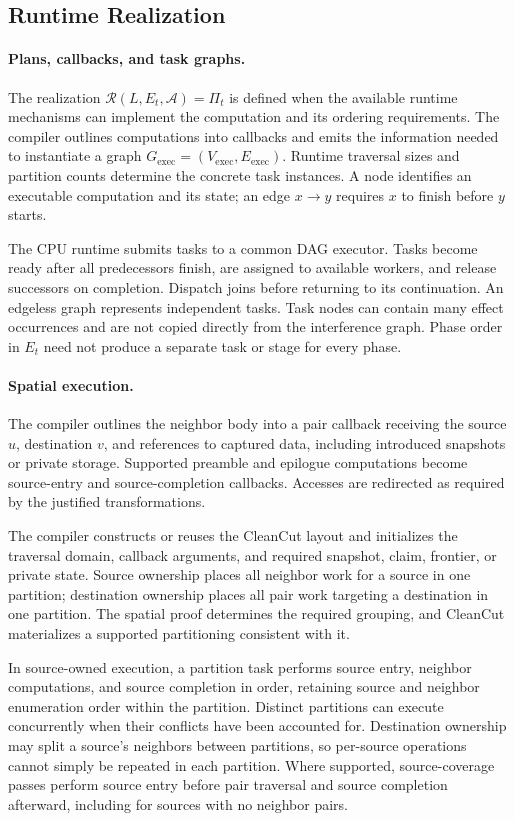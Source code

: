 \subsection{Runtime Realization}
\label{app:effects-runtime}
\paragraph{Plans, callbacks, and task graphs.}
The realization $\mathcal R(L,E_t,\mathcal A)=\Pi_t$ is defined when the
available runtime mechanisms can implement the computation and its
ordering requirements. The compiler outlines computations into callbacks
and emits the information needed to instantiate a graph
$G_{\mathrm{exec}}=(V_{\mathrm{exec}},E_{\mathrm{exec}})$.
Runtime traversal sizes and partition counts determine the concrete task
instances. A node identifies an executable computation and its state;
an edge $x\rightarrow y$ requires $x$ to finish before $y$ starts.

The CPU runtime submits tasks to a common DAG executor. Tasks become
ready after all predecessors finish, are assigned to available workers,
and release successors on completion. Dispatch joins before returning
to its continuation. An edgeless graph represents independent tasks.
Task nodes can contain many effect occurrences and are not copied
directly from the interference graph. Phase order in $E_t$ need not
produce a separate task or stage for every phase.

\paragraph{Spatial execution.}
The compiler outlines the neighbor body into a pair callback receiving
the source $u$, destination $v$, and references to captured data,
including introduced snapshots or private storage. Supported preamble
and epilogue computations become source-entry and source-completion
callbacks. Accesses are redirected as required by the justified
transformations.

The compiler constructs or reuses the CleanCut layout and initializes
the traversal domain, callback arguments, and required snapshot, claim,
frontier, or private state. Source ownership places all neighbor work
for a source in one partition; destination ownership places all pair
work targeting a destination in one partition. The spatial proof
determines the required grouping, and CleanCut materializes a supported
partitioning consistent with it.

In source-owned execution, a partition task performs source entry,
neighbor computations, and source completion in order, retaining source
and neighbor enumeration order within the partition. Distinct partitions
can execute concurrently when their conflicts have been accounted for.
Destination ownership may split a source's neighbors between partitions,
so per-source operations cannot simply be repeated in each partition.
Where supported, source-coverage passes perform source entry before
pair traversal and source completion afterward, including for sources
with no neighbor pairs.

